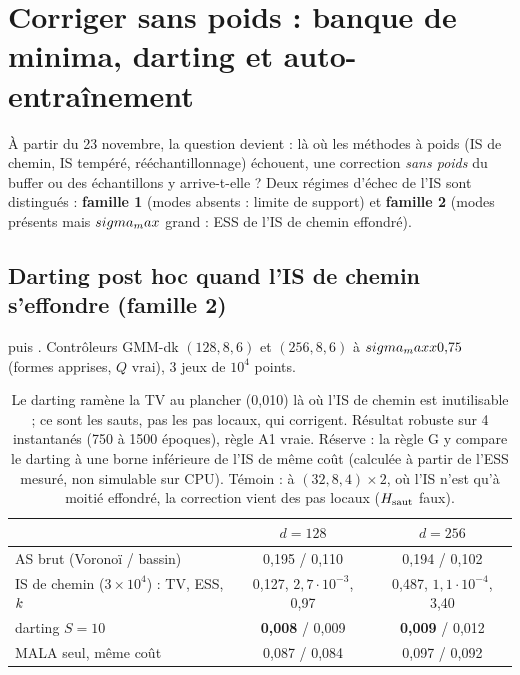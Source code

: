 \section{Corriger sans poids : banque de minima, darting et auto-entraînement}
\label{sec:sanspoids}

À partir du 23 novembre, la question devient : là où les méthodes à poids (IS de chemin, IS tempéré, rééchantillonnage) échouent, une correction \emph{sans poids} du buffer ou des échantillons y arrive-t-elle ? Deux régimes d'échec de l'IS sont distingués : \textbf{famille 1} (modes absents : limite de support) et \textbf{famille 2} (modes présents mais $sigma_max$ grand : ESS de l'IS de chemin effondré).

\subsection{Darting post hoc quand l'IS de chemin s'effondre (famille 2)}
 puis . Contrôleurs GMM-dk $(128,8,6)$ et $(256,8,6)$ à $sigma_maxx0{,}75$ (formes apprises, $Q$ vrai), 3 jeux de $10^4$ points.
\begin{table}[h]\centering\small
\begin{tabular}{lcc}\toprule
 & $d=128$ & $d=256$\\\midrule
AS brut (Voronoï / bassin) & 0,195 / 0,110 & 0,194 / 0,102\\
IS de chemin ($3\times10^4$) : TV, ESS, $k$ & 0,127, $2{,}7\cdot10^{-3}$, 0,97 & 0,487, $1{,}1\cdot10^{-4}$, 3,40\\
darting $S=10$ & \textbf{0,008} / 0,009 & \textbf{0,009} / 0,012\\
MALA seul, même coût & 0,087 / 0,084 & 0,097 / 0,092\\\bottomrule
\end{tabular}
\caption{Le darting ramène la TV au plancher (0,010) là où l'IS de chemin est inutilisable ; ce sont les sauts, pas les pas locaux, qui corrigent. Résultat robuste sur 4 instantanés (750 à 1500 époques), règle A1 vraie. Réserve : la règle G y compare le darting à une borne inférieure de l'IS de même coût (calculée à partir de l'ESS mesuré, non simulable sur CPU). Témoin : à $(32,8,4)\times2$, où l'IS n'est qu'à moitié effondré, la correction vient des pas locaux ($H_{\rm saut}$ faux).}
\end{table}
